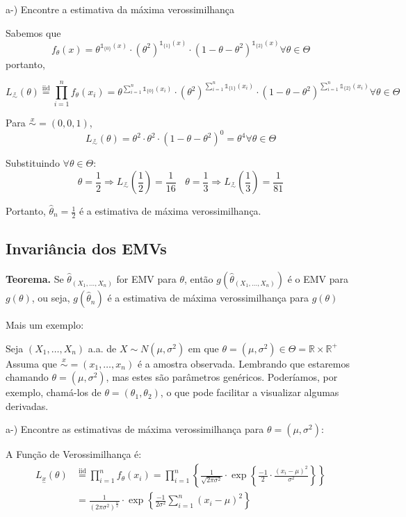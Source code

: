 \documentclass[
  letterpaper,
  DIV=11,
  numbers=noendperiod]{scrreprt}
\begin{document}
a-) Encontre a estimativa da máxima verossimilhança

Sabemos que \[
f_{\theta}(x)= \theta^{\mathbb{1}_{\{0\}}(x)} \cdot (\theta^{2})^{\mathbb{1}_{\{1\}}(x)} \cdot
(1-\theta-\theta^{2})^{\mathbb{1}_{\{2\}}(x)} \forall \theta \in \Theta
\] portanto,

\[
L_{\stackrel{x}{\sim}}(\theta)\stackrel{\text{iid}}{=}\prod^{n}_{i=1}f_{\theta}(x_{i})  = 
\theta^{\sum\limits^{n}_{i=1}\mathbb{1}_{\{0\}}(x_{i})} \cdot (\theta^{2})^{\sum\limits^{n}_{i=1}\mathbb{1}_{\{1\}}(x_{i})} 
\cdot (1-\theta-\theta^{2})^{\sum\limits^{n}_{i=1}\mathbb{1}_{\{2\}}(x_{i})} \forall \theta \in \Theta
\]

Para \(\stackrel{x}{\sim}=(0,0,1)\), \[
L_{\stackrel{x}{\sim}}(\theta) = \theta^{2} \cdot \theta^{2} \cdot (1-\theta -\theta^{2})^{0} = \theta^{4}
\forall \theta \in \Theta
\]

Substituindo \(\forall \theta \in \Theta\): \[
\theta = \frac{1}{2}\Rightarrow L_{\stackrel{x}{\sim}}\left(\frac{1}{2}\right)=\frac{1}{16} ~~~~ \theta =
\frac{1}{3}\Rightarrow L_{\stackrel{x}{\sim}}\left(\frac{1}{3}\right)=\frac{1}{81}
\]

Portanto, \(\hat\theta_{n}=\frac{1}{2}\) é a estimativa de máxima
verossimilhança.

\subsection{Invariância dos EMVs}\label{invariuxe2ncia-dos-emvs}

\textbf{Teorema.} Se \(\hat\theta_{(X_{1},\dots,X_{n})}\) for EMV para
\(\theta\), então \(g(\hat\theta_{(X_{1},\dots,X_{n})})\) é o EMV para
\(g(\theta)\), ou seja, \(g(\hat\theta_n)\) é a estimativa de máxima
verossimilhança para \(g(\theta)\)

Mais um exemplo:

Seja \((X_{1},\dots,X_{n})\) a.a. de \(X\sim N(\mu, \sigma^2)\) em que
\(\theta = (\mu, \sigma^{2}) \in \Theta=\mathbb{R}\times \mathbb{R}^{+}\)
Assuma que \(\stackrel{x}{\sim} = (x_{1},\dots,x_{n})\) é a amostra
observada. Lembrando que estaremos chamando
\(\theta=(\mu, \sigma^{2})\), mas estes são parâmetros genéricos.
Poderíamos, por exemplo, chamá-los de
\(\theta=(\theta_{1},\theta_{2})\), o que pode facilitar a visualizar
algumas derivadas.

a-) Encontre as estimativas de máxima verossimilhança para
\(\theta = (\mu, \sigma^{2})\):

A Função de Verossimilhança é: \[
\begin{aligned}
L_{\underset{\sim}{x}}(\theta)&\stackrel{\text{iid}}{=}\prod^{n}_{i=1}f_\theta(x_{i}) = \prod^{n}_{i=1}
\left\{ \frac{1}{\sqrt{2 \pi \sigma^{2}}}\cdot \exp\left\{\frac{-1}{2}\cdot\frac{(x_{i}-\mu)^{2}}{\sigma^{2}} \right\} \right\}\\
&= \frac{1}{(2\pi \sigma^{2})^{\frac{n}{2}}} \cdot \exp\left\{ \frac{-1}{2\sigma^{2}}\sum\limits^{n}_{i=1}(x_{i}-\mu)^{2}\right\}
\end{aligned}
\]
\end{document}
